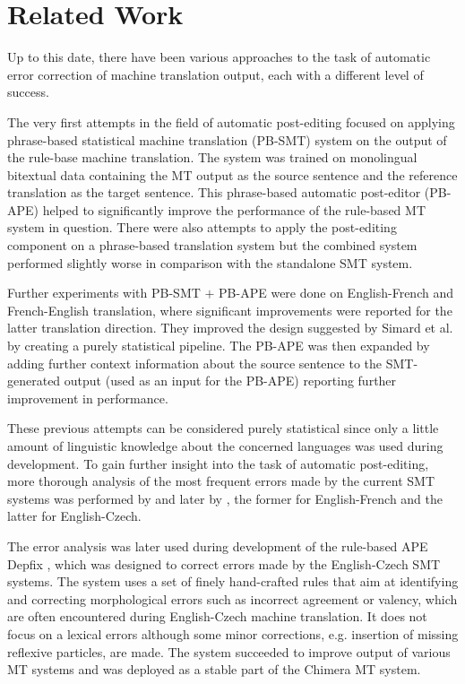 \section{Related Work}

Up to this date, there have been various approaches to the task of automatic
error correction of machine translation output, each with a different level of success.

The very first attempts in the field of automatic post-editing \citep{simard2007rule}
focused on applying phrase-based statistical machine translation (PB-SMT)
system on the output of the rule-base machine translation. The system was trained on monolingual
bitextual data containing the MT output as the source sentence and the reference translation as
the target sentence. This phrase-based automatic post-editor (PB-APE) helped to significantly improve
the performance of the rule-based MT system in question.
There were also attempts to apply the post-editing component
on a phrase-based translation system but the combined system performed slightly worse in comparison
with the standalone SMT system.

Further experiments with PB-SMT $+$ PB-APE \citep{bechara:2011} were done
on English-French and French-English translation, where significant improvements were reported
for the latter translation direction. They improved the design suggested by Simard et al. by
creating a purely statistical pipeline. The PB-APE was then expanded by adding further 
context information about the source sentence to the SMT-generated output (used as an input for
the PB-APE) reporting further improvement in performance.

These previous attempts can be considered purely statistical since only a little amount of linguistic
knowledge about the concerned languages was used during development. To gain further insight into
the task of automatic post-editing, more thorough analysis of the most frequent errors made by the current
SMT systems was performed by \citet{bechara:master} and later by \citet{biblio:RoAutomaticpostediting2013}, the former
for English-French and the latter for English-Czech.

The error analysis was later used during development of the rule-based APE Depfix \citep{depfix:2014},
which was designed to correct errors made by the English-Czech SMT systems.
The system uses a set of finely hand-crafted rules that aim at identifying
and correcting morphological errors such as incorrect agreement or valency, which are
often encountered during English-Czech machine translation. It does not focus on a lexical errors
although some minor corrections, e.g. insertion of missing reflexive particles, are made. The system
succeeded to improve output of various MT systems and was deployed as a stable part of the
Chimera \citep{bojar-rosa-tamchyna:2013:WMT} MT system.

